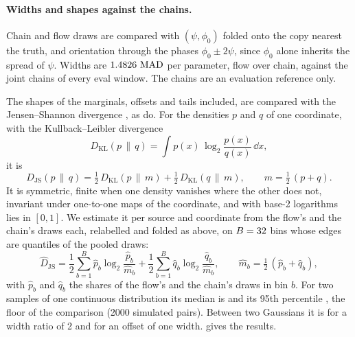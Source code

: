 \paragraph{Widths and shapes against the chains.}
\label{app:evaluation-mcmc}
Chain and flow draws are compared with $(\psi,\phi_0)$ folded onto the copy nearest the truth, and orientation through
the phases $\phi_0 \pm 2\psi$, since $\phi_0$ alone inherits the spread of $\psi$. Widths are $1.4826\,\operatorname{MAD}$ per parameter, flow over chain, against
the joint chains of every eval window. The chains are an evaluation reference only.

The shapes of the marginals, offsets and tails included, are compared with the Jensen--Shannon divergence
\citep{lin1991divergence}, as \citet{delmond2026neural} do. For the densities $p$ and $q$ of one coordinate, with the
Kullback--Leibler divergence \citep{kullback1951information}
\begin{equation}
  D_{\mathrm{KL}}(p\,\|\,q) = \int p(x)\,\log_2\frac{p(x)}{q(x)}\,\dd x ,
  \label{eq:evaluation-kl}
\end{equation}
it is
\begin{equation}
  D_{\mathrm{JS}}(p\,\|\,q) = \tfrac12\,D_{\mathrm{KL}}(p\,\|\,m) + \tfrac12\,D_{\mathrm{KL}}(q\,\|\,m),
  \qquad m = \tfrac12\,(p+q).
  \label{eq:evaluation-js}
\end{equation}
It is symmetric, finite when one density vanishes where the other does not, invariant under one-to-one maps of the
coordinate, and with base-2 logarithms lies in $[0,1]$. We estimate it per source and coordinate from the flow's and the
chain's \ResultsJsDraws{} draws each, relabelled and folded as above, on $B=32$ bins whose edges are
quantiles of the pooled draws:
\begin{equation}
  \hat D_{\mathrm{JS}} = \frac12\sum_{b=1}^{B}\hat p_b\log_2\frac{\hat p_b}{\hat m_b}
  + \frac12\sum_{b=1}^{B}\hat q_b\log_2\frac{\hat q_b}{\hat m_b},
  \qquad \hat m_b = \tfrac12\,(\hat p_b+\hat q_b),
  \label{eq:evaluation-js-hat}
\end{equation}
with $\hat p_b$ and $\hat q_b$ the shares of the flow's and the chain's draws in bin $b$. For two samples of one continuous distribution its median is
\ResultsJsFloorMedian{} and its 95th percentile \ResultsJsFloorHigh{}, the floor of the comparison
(\num{2000} simulated pairs). Between two Gaussians it is \ResultsJsGaussWidthTwo{} for a width ratio of 2 and
\ResultsJsGaussOffsetOne{} for an offset of one width.
 gives the results.

